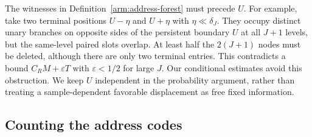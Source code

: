 \begin{remark}
The witnesses in Definition~\ref{arm:address-forest} must precede $U$.
For example, take two terminal positions $U-\eta$ and $U+\eta$ with
$\eta\ll\delta_J$.  They occupy distinct unary branches on opposite
sides of the persistent boundary $U$ at all $J+1$ levels, but the
same-level paired slots overlap.  At least half the $2(J+1)$ nodes
must be deleted, although there are only two terminal entries.  This
contradicts a bound $C_RM+\varepsilon T$ with $\varepsilon<1/2$ for
large $J$.  Our conditional estimates avoid this obstruction.  We keep
$U$ independent in the probability argument, rather than treating a
sample-dependent favorable displacement as free fixed information.
\end{remark}

\subsection{Counting the address codes}

